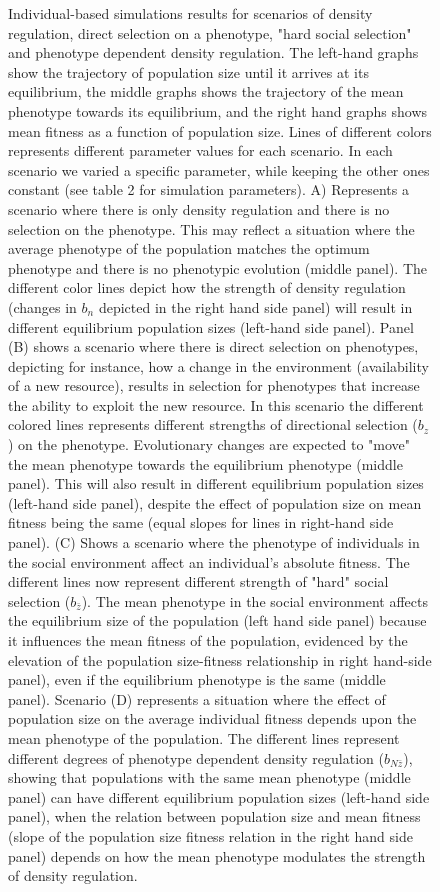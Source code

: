 \documentclass{article}
\begin{document}
\begin{figure}[ht]
	\caption{Individual-based simulations results for scenarios of density regulation, direct selection on a phenotype, "hard social selection" and phenotype dependent density regulation. The left-hand graphs show the trajectory of population size until it arrives at its equilibrium, the middle graphs shows the trajectory of the mean phenotype towards its equilibrium, and the right hand graphs shows mean fitness as a function of population size. Lines of different colors represents different parameter values for each scenario. In each scenario we varied a specific parameter, while keeping the other ones constant (see table 2 for simulation parameters). A) Represents a scenario where there is only density regulation and there is no selection on the phenotype. This may reflect a situation where the average phenotype of the population matches the optimum phenotype and there is no phenotypic evolution (middle panel). The different color lines depict how the strength of density regulation (changes in $b_n$ depicted in the right hand side panel) will result in different equilibrium population sizes (left-hand side panel). Panel (B) shows a scenario where there is direct selection on phenotypes, depicting for instance, how a change in the environment (availability of a new resource), results in selection for phenotypes that increase the ability to exploit the new resource. In this scenario the different colored lines represents different strengths of directional selection ($b_z$) on the phenotype. Evolutionary changes are expected to "move" the mean phenotype towards the equilibrium phenotype (middle panel). This will also result in different equilibrium population sizes (left-hand side panel), despite the effect of population size on mean fitness being the same (equal slopes for lines in right-hand side panel). (C) Shows a scenario where the phenotype of individuals in the social environment affect an individual's absolute fitness. The different lines now represent different strength of "hard" social selection ($b_{\bar{z}}$).  The mean phenotype in the social environment affects the equilibrium size of the population (left hand side panel) because it influences the mean fitness of the population, evidenced by the elevation of the population size-fitness relationship in right hand-side panel), even if the equilibrium phenotype is the same (middle panel). Scenario (D) represents a situation where the effect of population size on the average individual fitness depends upon the mean phenotype of the population. The different lines represent different degrees of phenotype dependent density regulation ($b_{N\bar{z}}$), showing that populations with the same mean phenotype (middle panel) can have different equilibrium population sizes (left-hand side panel), when the relation between population size and mean fitness (slope of the population size fitness relation in the right hand side panel) depends on how the mean phenotype modulates the strength of density regulation.}
	\label{fig:sim2}
\end{figure}
\end{document}
